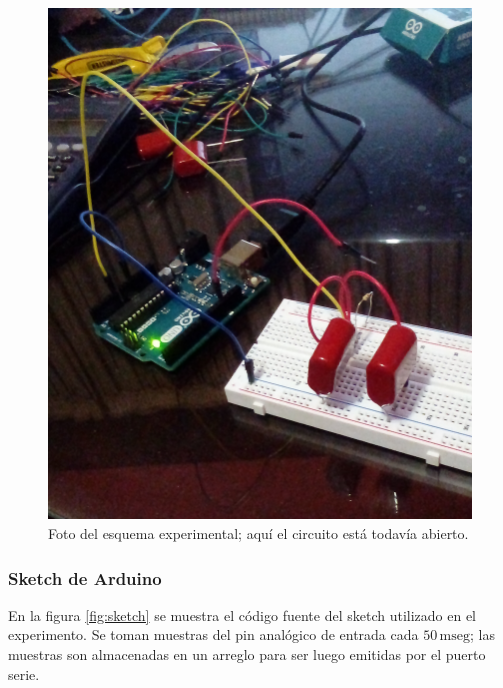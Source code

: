 \documentclass[parskip]{scrartcl}
\begin{document}
\begin{figure}[h]
  \centering
  \includegraphics[scale=0.15]{rcpic.png}
  \caption{Foto del esquema experimental; aquí el circuito está todavía abierto.}
  \label{fig:rcpic}
\end{figure}

\subsubsection{Sketch de Arduino}

En la figura \ref{fig:sketch} se muestra el código fuente del sketch utilizado en el experimento. Se toman muestras del pin analógico de entrada cada $50\,\mathrm{mseg}$; las muestras son almacenadas en un arreglo para ser luego emitidas por el puerto serie.
\end{document}
